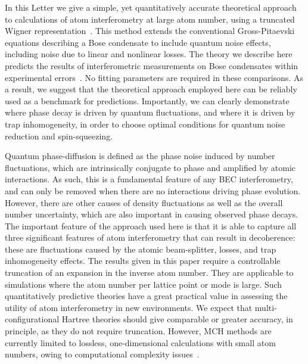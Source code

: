 \documentclass[aps,prl,twocolumn,showpacs,amsmath,amssymb,superscriptaddress,flushbottom,noraggedfooter]{revtex4-1}
\begin{document}
In this Letter we give a simple, yet quantitatively accurate
theoretical approach to calculations of atom interferometry at large atom number,
using a truncated Wigner representation~\cite{Drummond1993,Steel1998,Sinatra2002}.
This method extends the conventional Gross-Pitaevski equations
describing a Bose condensate to include quantum noise effects, including noise due to linear and nonlinear losses.
The theory we describe here predicts the results of
interferometric measurements on Bose condensates within experimental errors~\cite{Egorov2010}.
No fitting parameters are required in these comparisons.
As a result, we suggest that the theoretical approach employed here
can be reliably used as a benchmark for predictions.
Importantly, we can clearly demonstrate where phase decay is driven by quantum fluctuations,
and where it is driven by trap inhomogeneity, in order to choose optimal conditions for quantum noise reduction and spin-squeezing.

Quantum phase-diffusion is defined as the phase noise induced by number fluctuations,
which are intrinsically conjugate to phase and amplified by atomic interactions.
As such, this is a fundamental feature of any BEC interferometry,
and can only be removed when there are no interactions driving phase evolution.
However, there are other causes of density fluctuations as well as the overall number uncertainty,
which are also important in causing observed phase decays.
The important feature of the approach used here is that it is able to capture
all three significant features of atom interferometry that can result in decoherence:
these are fluctuations caused by the atomic beam-splitter, losses,
and trap inhomogeneity effects.
The results given in this paper require a controllable truncation
of an expansion in the inverse atom number.
They are applicable to simulations where the atom number per lattice point or mode is large.
Such quantitatively predictive theories have a great practical value
in assessing the utility of atom interferometry in new environments.
We expect that multi-configurational Hartree theories should give comparable or greater accuracy,
in principle, as they do not require truncation.
However, MCH methods are currently limited to lossless,
one-dimensional calculations with small atom numbers,
owing to computational complexity issues~\cite{Sakmann2009}.
\end{document}

